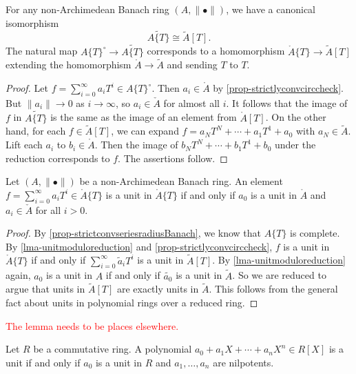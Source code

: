\begin{corollary}\label{cor-reductionstrictlyconv}
    For any non-Archimedean Banach ring $(A,\|\bullet\|)$, we have a canonical isomorphism
    \[
        \widetilde{A\{T\}}\cong \tilde{A}[T].
    \]
    The natural map ${A\{T\}}^{\circ}\rightarrow \widetilde{A\{T\}}$ corresponds to a homomorphism $\mathring{A}\{T\}\rightarrow \tilde{A}[T]$ extending the homomorphism $\mathring{A}\rightarrow \tilde{A}$ and sending $T$ to $T$.
\end{corollary}
\begin{proof}
    Let $f=\sum_{i=0}^{\infty}a_i T^i\in {A\{T\}}^{\circ}$. 
    Then $a_i\in \mathring{A}$ by \cref{prop-strictlyconvcirccheck}. But $\|a_i\|\to 0$ as $i\to\infty$, so $a_i\in \check{A}$ for almost all $i$. It follows that the image of $f$ in $\widetilde{A\{T\}}$ is the same as the image of an element from $\mathring{A}[T]$. On the other hand, for each $f\in \tilde{A}[T]$, we can expand $f=a_NT^N+\cdots+a_1T^1+a_0$ with $a_N\in \tilde{A}$. Lift each $a_i$ to $b_i\in \mathring{A}$. Then the image of $b_NT^N+\cdots+b_1T^1+b_0$ under the reduction corresponds to $f$. The assertions follow.
\end{proof}

\begin{corollary}\label{cor-unitsstrictlyconv}
    Let $(A,\|\bullet\|)$ be a non-Archimedean Banach ring. An element $f=\sum_{i=0}^{\infty}a_i T^i\in \mathring{A}\{T\}$ is a unit in $\mathring{A}\{T\}$ if and only if $a_0$ is a unit in  $\mathring{A}$ and $a_i\in \check{A}$ for all $i>0$.
\end{corollary}
\begin{proof}
By \cref{prop-strictconvseriesradiusBanach}, we know that $A\{T\}$ is complete.
By \cref{lma-unitmoduloreduction} and \cref{prop-strictlyconvcirccheck}, $f$ is a unit in $\mathring{A}\{T\}$ if and only if $\sum_{i=0}^{\infty} \tilde{a}_i T^i$  is a unit in $\tilde{A}[T]$. By \cref{lma-unitmoduloreduction} again, $a_0$ is a unit in $A$ if and only if $\tilde{a_0}$ is a unit in $\tilde{A}$. So we are reduced to argue that units in $\tilde{A}[T]$ are exactly units in $\tilde{A}$. This follows from the general fact about units in polynomial rings over a reduced ring.
\end{proof}

\textcolor{red}{The lemma needs to be places elsewhere.}
\begin{lemma}
    Let $R$ be a commutative ring. A polynomial $a_0+a_1X+\cdots+a_nX^n\in R[X]$ is a unit if and only if $a_0$ is a unit in $R$ and $a_1,\ldots,a_n$ are nilpotents.
\end{lemma}

